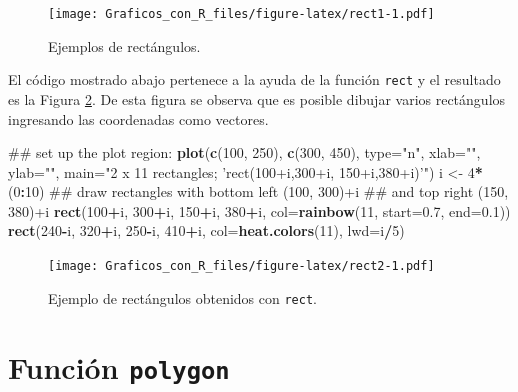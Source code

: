 \documentclass[10pt,]{krantz}
\makeatletter
\newenvironment{Shaded}{\begin{snugshade}}{\end{snugshade}}
\newcommand{\KeywordTok}[1]{\textcolor[rgb]{0.13,0.29,0.53}{\textbf{#1}}}
\newcommand{\DataTypeTok}[1]{\textcolor[rgb]{0.13,0.29,0.53}{#1}}
\newcommand{\DecValTok}[1]{\textcolor[rgb]{0.00,0.00,0.81}{#1}}
\newcommand{\FloatTok}[1]{\textcolor[rgb]{0.00,0.00,0.81}{#1}}
\newcommand{\StringTok}[1]{\textcolor[rgb]{0.31,0.60,0.02}{#1}}
\newcommand{\OperatorTok}[1]{\textcolor[rgb]{0.81,0.36,0.00}{\textbf{#1}}}
\newcommand{\NormalTok}[1]{#1}
\newenvironment{kframe}{%
\medskip{}
\setlength{\fboxsep}{.8em}
 \def\at@end@of@kframe{}%
 \ifinner\ifhmode%
  \def\at@end@of@kframe{\end{minipage}}%
  \begin{minipage}{\columnwidth}%
 \fi\fi%
 \def\FrameCommand##1{\hskip\@totalleftmargin \hskip-\fboxsep
 \colorbox{shadecolor}{##1}\hskip-\fboxsep
     \hskip-\linewidth \hskip-\@totalleftmargin \hskip\columnwidth}%
 \MakeFramed {\advance\hsize-\width
   \@totalleftmargin\z@ \linewidth\hsize
   \@setminipage}}%
 {\par\unskip\endMakeFramed%
 \at@end@of@kframe}
\renewenvironment{Shaded}{\begin{kframe}}{\end{kframe}}
\makeatother
\begin{document}
\begin{figure}
\centering
\texttt{[image: Graficos\_con\_R\_files/figure-latex/rect1-1.pdf]}
\caption{\label{fig:rect1}Ejemplos de rectángulos.}
\end{figure}

El código mostrado abajo pertenece a la ayuda de la función
\texttt{rect} y el resultado es la Figura \ref{fig:rect2}. De esta
figura se observa que es posible dibujar varios rectángulos ingresando
las coordenadas como vectores.

\begin{Shaded}
\begin{Highlighting}[]
\NormalTok{## set up the plot region:}
\KeywordTok{plot}\NormalTok{(}\KeywordTok{c}\NormalTok{(}\DecValTok{100}\NormalTok{, }\DecValTok{250}\NormalTok{), }\KeywordTok{c}\NormalTok{(}\DecValTok{300}\NormalTok{, }\DecValTok{450}\NormalTok{), }\DataTypeTok{type=}\StringTok{"n"}\NormalTok{, }\DataTypeTok{xlab=}\StringTok{""}\NormalTok{, }\DataTypeTok{ylab=}\StringTok{""}\NormalTok{,}
     \DataTypeTok{main=}\StringTok{"2 x 11 rectangles; 'rect(100+i,300+i, 150+i,380+i)'"}\NormalTok{)}
\NormalTok{i <-}\StringTok{ }\DecValTok{4}\OperatorTok{*}\NormalTok{(}\DecValTok{0}\OperatorTok{:}\DecValTok{10}\NormalTok{)}
\NormalTok{## draw rectangles with bottom left (100, 300)+i}
\NormalTok{## and top right (150, 380)+i}
\KeywordTok{rect}\NormalTok{(}\DecValTok{100}\OperatorTok{+}\NormalTok{i, }\DecValTok{300}\OperatorTok{+}\NormalTok{i, }\DecValTok{150}\OperatorTok{+}\NormalTok{i, }\DecValTok{380}\OperatorTok{+}\NormalTok{i, }\DataTypeTok{col=}\KeywordTok{rainbow}\NormalTok{(}\DecValTok{11}\NormalTok{, }\DataTypeTok{start=}\FloatTok{0.7}\NormalTok{, }\DataTypeTok{end=}\FloatTok{0.1}\NormalTok{))}
\KeywordTok{rect}\NormalTok{(}\DecValTok{240}\OperatorTok{-}\NormalTok{i, }\DecValTok{320}\OperatorTok{+}\NormalTok{i, }\DecValTok{250}\OperatorTok{-}\NormalTok{i, }\DecValTok{410}\OperatorTok{+}\NormalTok{i, }\DataTypeTok{col=}\KeywordTok{heat.colors}\NormalTok{(}\DecValTok{11}\NormalTok{), }\DataTypeTok{lwd=}\NormalTok{i}\OperatorTok{/}\DecValTok{5}\NormalTok{)}
\end{Highlighting}
\end{Shaded}

\begin{figure}
\centering
\texttt{[image: Graficos\_con\_R\_files/figure-latex/rect2-1.pdf]}
\caption{\label{fig:rect2}Ejemplo de rectángulos obtenidos con
\texttt{rect}.}
\end{figure}

\section{\texorpdfstring{Función \texttt{polygon} 
}{Función polygon  }}\label{funcion-polygon}
\end{document}
